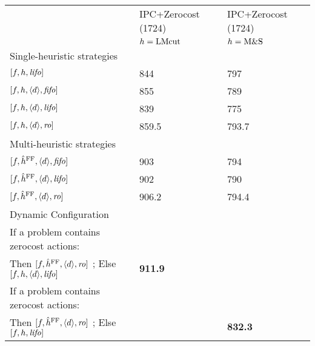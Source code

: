 \begin{center}
\begin{tabular}{|l|l|l|}
\hline
 & IPC+Zerocost (1724) & IPC+Zerocost (1724)\\
 & \(h=\text{LMcut}\) & \(h=\text{M\&S}\)\\
Single-heuristic strategies &  & \\
\([f,h,{\text{\textit{lifo}}}]\) & 844 & 797\\
\([f,h,{\left<d\right>},{\text{\textit{fifo}}}]\) & 855 & 789\\
\([f,h,{\left<d\right>},{\text{\textit{lifo}}}]\) & 839 & 775\\
\([f,h,{\left<d\right>},{\text{\textit{ro}}}]\) & 859.5 & 793.7\\[0.3em]
Multi-heuristic strategies &  & \\
\([f,\hat{h}^{\text{FF}},{\left<d\right>},{\text{\textit{fifo}}}]\) & 903 & 794\\
\([f,\hat{h}^{\text{FF}},{\left<d\right>},{\text{\textit{lifo}}}]\) & 902 & 790\\
\([f,\hat{h}^{\text{FF}},{\left<d\right>},{\text{\textit{ro}}}]\) & 906.2 & 794.4\\[0.5em]
Dynamic Configuration &  & \\
If a problem contains zerocost actions: &  & \\
Then \([f,\hat{h}^{\text{FF}},{\left<d\right>},{\text{\textit{ro}}}]\) ; Else \([f,h,{\left<d\right>},{\text{\textit{lifo}}}]\) & \textbf{911.9} & \\[0.3em]
If a problem contains zerocost actions: &  & \\
Then \([f,\hat{h}^{\text{FF}},{\left<d\right>},{\text{\textit{ro}}}]\) ; Else \([f,h,{\text{\textit{lifo}}}]\) &  & \textbf{832.3}\\
\hline
\end{tabular}
\end{center}
